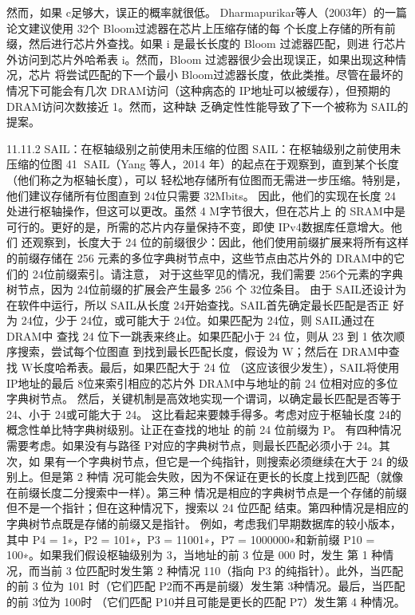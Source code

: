 然而，如果 c足够大，误正的概率就很低。
Dharmapurikar等人（2003年）的一篇论文建议使用 32个 Bloom过滤器在芯片上压缩存储的每
个长度上存储的所有前缀，然后进行芯片外查找。如果 i 是最长长度的 Bloom 过滤器匹配，则进
行芯片外访问到芯片外哈希表 i。然而，Bloom 过滤器很少会出现误正，如果出现这种情况，芯片
将尝试匹配的下一个最小 Bloom过滤器长度，依此类推。尽管在最坏的情况下可能会有几次
DRAM访问（这种病态的 IP地址可以被缓存），但预期的 DRAM访问次数接近 1。然而，这种缺
乏确定性性能导致了下一个被称为 SAIL的提案。

11.11.2 SAIL：在枢轴级别之前使用未压缩的位图
SAIL：在枢轴级别之前使用未压缩的位图
                                                        41
SAIL（Yang 等人，2014 年）的起点在于观察到，直到某个长度（他们称之为枢轴长度），可以
轻松地存储所有位图而无需进一步压缩。特别是，他们建议存储所有位图直到 24位只需要
32Mbits。
因此，他们的实现在长度 24 处进行枢轴操作，但这可以更改。虽然 4 M字节很大，但在芯片上
的 SRAM中是可行的。更好的是，所需的芯片内存量保持不变，即使 IPv4数据库任意增大。他们
还观察到，长度大于 24 位的前缀很少：因此，他们使用前缀扩展来将所有这样的前缀存储在
256 元素的多位字典树节点中，这些节点由芯片外的 DRAM中的它们的 24位前缀索引。请注意，
对于这些罕见的情况，我们需要 256个元素的字典树节点，因为 24位前缀的扩展会产生最多 256
个 32位条目。
由于 SAIL还设计为在软件中运行，所以 SAIL从长度 24开始查找。SAIL首先确定最长匹配是否正
好为 24位，少于 24位，或可能大于 24位。如果匹配为 24位，则 SAIL通过在 DRAM中
查找 24 位下一跳表来终止。如果匹配小于 24 位，则从 23 到 1 依次顺序搜索，尝试每个位图直
到找到最长匹配长度，假设为 W；然后在 DRAM中查找 W长度哈希表。最后，如果匹配大于 24
位
（这应该很少发生），SAIL将使用 IP地址的最后 8位来索引相应的芯片外 DRAM中与地址的前
24
位相对应的多位字典树节点。
然后，关键机制是高效地实现一个谓词，以确定最长匹配是否等于 24、小于 24或可能大于 24。
这比看起来要棘手得多。考虑对应于枢轴长度 24的概念性单比特字典树级别。让正在查找的地址
的前 24 位前缀为 P。
有四种情况需要考虑。如果没有与路径 P对应的字典树节点，则最长匹配必须小于 24。其次，如
果有一个字典树节点，但它是一个纯指针，则搜索必须继续在大于 24 的级别上。但是第 2 种情
况可能会失败，因为不保证在更长的长度上找到匹配（就像在前缀长度二分搜索中一样）。第三种
情况是相应的字典树节点是一个存储的前缀但不是一个指针；但在这种情况下，搜索以 24 位匹配
结束。第四种情况是相应的字典树节点既是存储的前缀又是指针。
例如，考虑我们早期数据库的较小版本，其中 P4 = 1∗，P2 = 101∗，P3 = 11001∗，P7 =
1000000∗和新前缀 P10 = 100∗。如果我们假设枢轴级别为 3，当地址的前 3 位是 000 时，发生
第 1 种情况，而当前 3 位匹配时发生第 2 种情况 110（指向 P3 的纯指针）。此外，当匹配的前
3 位为 101 时（它们匹配 P2而不再是前缀）发生第 3种情况。最后，当匹配的前 3位为 100时
（它们匹配 P10并且可能是更长的匹配 P7）发生第 4 种情况。


